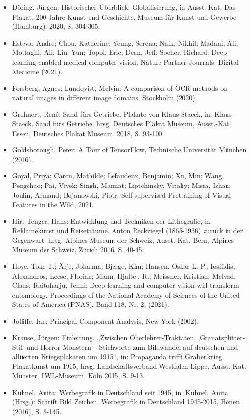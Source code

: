 \documentclass[a4paper,12pt,ngerman]{article}
\begin{document}
\begin{itemize}
	\item Döring, Jürgen: Historischer Überblick. Globalisierung, in Ausst. Kat. Das Plakat. 200 Jahre Kunst und Geschichte, Museum für Kunst und Gewerbe (Hamburg), 2020, S. 304-305.
	\item Esteva, Andre; Chou, Katherine; Yeung, Serena; Naik, Nikhil; Madani, Ali; Mottaghi, Ali; Liu, Yun; Topol, Eric; Dean, Jeff; Socher, Richard: Deep learning-enabled medical computer vision, Nature Partner Journals. Digital Medicine (2021). 
	\item Forsberg, Agnes; Lundqvist, Melvin: A comparison of OCR methods on natural images in different image domains, Stockholm (2020).
	\item Grohnert, René: Sand fürs Getriebe. Plakate von Klaus Staeck, in: Klaus Staeck. Sand fürs Getriebe, hrsg. Deutsches Plakat Museum, Ausst.-Kat. Essen, Deutsches Plakat Museum, 2018, S. 93-100.
	\item Goldsborough, Peter: A Tour of TensorFlow, Technische Universität München (2016).
	\item Goyal, Priya; Caron, Mathilde; Lefaudeux, Benjamin; Xu, Min; Wang, Pengchao; Pai, Vivek; Singh, Mannat; Liptchinsky, Vitaliy; Misra, Ishan; Joulin, Armand; Bojanowski, Piotr: Self-supervised Pretraining of Visual Features in the Wild, 2021. 
	\item Hirt-Tenger, Hans: Entwicklung und Techniken der Lithografie, in: Reklamekunst und Reiseträume. Anton Reckziegel (1865-1936) zurück in der Gegenwart, hrsg. Alpines Museum der Schweiz, Ausst.-Kat. Bern, Alpines Museum der Schweiz, Zürich 2016, S. 40-45.
	\item Hoye, Toke T.; Ärje, Johanna; Bjerge, Kim; Hansen, Oskar L. P.; Iosifidis, Alexandros; Leese, Florian; Mann, Hjalte . R.; Meissner, Kristian; Melvad, Claus; Raitoharju, Jenni: Deep learning and computer vision will transform entomology, Proceedings of the National Academy of Sciences of the United States of America (PNAS), Band 118, Nr. 2, (2021).
	\item Jolliffe, Ian: Principal Component Analysis, New York (2002).
	\item Krause, Jürgen: Einleitung. „Zwischen Oberlehrer-Traktaten, ‚Granatsplitter-Stil‘ und Horror-Monstern -- Stichworte zum Bildwandel auf deutschen und alliierten Kriegsplakaten um 1915“, in: Propaganda trifft Grabenkrieg. Plakatkunst um 1915, hrsg. Landschaftsverband Westfalen-Lippe, Ausst.-Kat. Münster, LWL-Museum, Köln 2015, S. 9-13.
	\item Kühnel, Anita: Werbegrafik in Deutschland seit 1945, in: Kühnel, Anita (Hrsg.): Schrift Bild Zeichen. Werbegrafik in Deutschland 1945-2015, Bönen (2016), S. 8-145.

\end{itemize}
\end{document}
